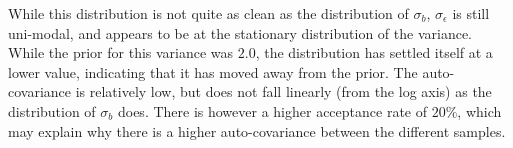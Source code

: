 \documentclass[12pt]{paper}
\begin{document}
While this distribution is not quite as clean as the distribution of
\(\sigma_b\), $\sigma_{\epsilon}$ is still uni-modal, and appears to be at the stationary
distribution of the variance. While the prior for this variance was
\(2.0\), the distribution has settled itself at a lower value,
indicating that it has moved away from the prior. The auto-covariance
is relatively low, but does not fall linearly (from the log axis) as
the distribution of $\sigma_b$ does. There is however a higher acceptance
rate of $20\%$, which may explain why there is a higher
auto-covariance between the different samples. 
\end{document}
